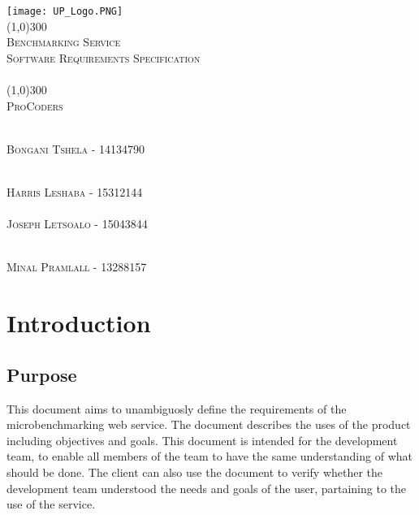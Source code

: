 \documentclass[runningheads,a4paper]{article}
\begin{document}
	
\begin{titlepage}
	\begin{center}
		\texttt{[image: UP\_Logo.PNG]}  \\
		[1cm]
		\line(1,0){300} \\
		[0.3cm]
		\textsc{\Large
			Benchmarking Service\\
			Software Requirements Specification\\
			\hfill
		}\\
		[0.1cm]
		\line(1,0){300} \\
		[0.7cm]
		\textsc{\Large
			ProCoders
		} \\
	\end{center}
	
	\begin{center}
		\begin{centre}
			\textsc{\large\\
				Bongani Tshela - 14134790\\ 
			}
		
				\textsc{\large\\
					Harris Leshaba - 15312144\\ 
				}
			\textsc{\large\\
				Joseph Letsoalo - 15043844\\ 
			}
			
			\textsc{\large\\
				Minal Pramlall - 13288157\\ 
			}
			

            

		\end{centre}
		
		
		
	\end{center}
\end{titlepage}

\begingroup

\tableofcontents
{}
\endgroup
\newpage

\section{Introduction}
\subsection{Purpose}
	This document aims to unambiguosly define the requirements of the microbenchmarking web service.
	The document describes the uses of the product including objectives and goals.
	This document is intended for the development team, to enable all members of the team to have the
	same understanding of what should be done. The client can also use the document to verify whether the
	development team understood the needs and goals of the user, partaining to the use of the service.
\end{document}
